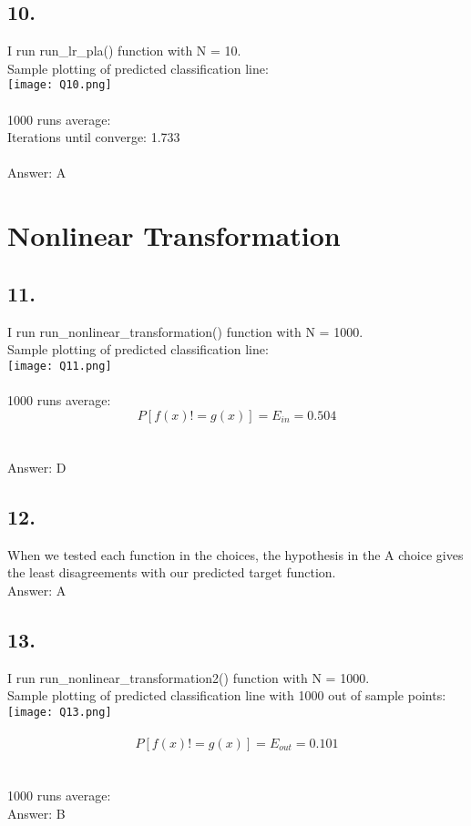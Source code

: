 \documentclass{homework}
\begin{document}
\subsection*{10.}
I run run_lr_pla() function with N = 10.\\ 
Sample plotting of predicted classification line:\\
\texttt{[image: Q10.png]} \\\\
1000 runs average:\\
Iterations until converge: 1.733\\\\
Answer: A

\section*{Nonlinear Transformation}
\subsection*{11.}
I run run_nonlinear_transformation() function with N = 1000.\\ 
Sample plotting of predicted classification line:\\
\texttt{[image: Q11.png]} \\\\
1000 runs average:\\
\[P[f(x) != g(x)] = E_{in}=  0.504\]\\\\
Answer: D

\subsection*{12.}
When we tested each function in the choices, the hypothesis in the A choice gives the least disagreements with our predicted target function.\\
Answer: A

\subsection*{13.}
I run run_nonlinear_transformation2() function with N = 1000.\\ 
Sample plotting of predicted classification line with 1000 out of sample points:\\
\texttt{[image: Q13.png]} \\\\
\[P[f(x) != g(x)] = E_{out}=  0.101\]\\\\
1000 runs average:\\
Answer:  B
\end{document}

